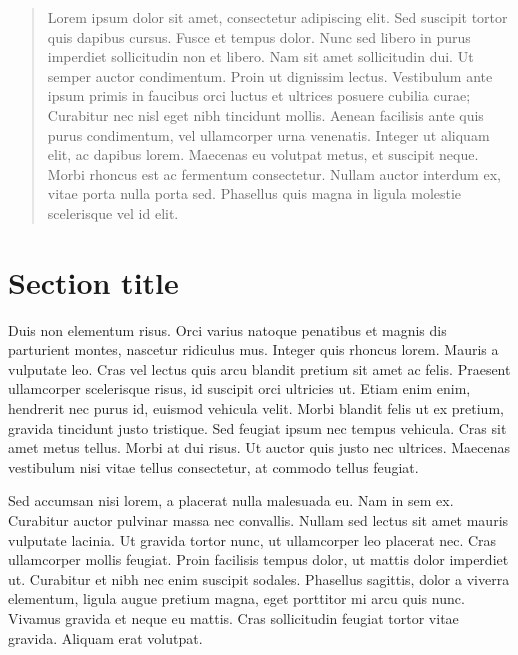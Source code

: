 \documentclass{tufte-handout}
\begin{document}
	\begin{abstract}
		Lorem ipsum dolor sit amet, consectetur adipiscing elit. Sed suscipit tortor quis dapibus cursus. Fusce et tempus dolor. Nunc sed libero in purus imperdiet sollicitudin non et libero. Nam sit amet sollicitudin dui. Ut semper auctor condimentum. Proin ut dignissim lectus. Vestibulum ante ipsum primis in faucibus orci luctus et ultrices posuere cubilia curae; Curabitur nec nisl eget nibh tincidunt mollis. Aenean facilisis ante quis purus condimentum, vel ullamcorper urna venenatis. Integer ut aliquam elit, ac dapibus lorem. Maecenas eu volutpat metus, et suscipit neque. Morbi rhoncus est ac fermentum consectetur. Nullam auctor interdum ex, vitae porta nulla porta sed. Phasellus quis magna in ligula molestie scelerisque vel id elit.
	\end{abstract}
	
	\section{Section title}
		
	Duis non elementum risus. Orci varius natoque penatibus et magnis dis parturient montes, nascetur ridiculus mus. Integer quis rhoncus lorem. Mauris a vulputate leo. Cras vel lectus quis arcu blandit pretium sit amet ac felis. Praesent ullamcorper scelerisque risus, id suscipit orci ultricies ut. Etiam enim enim, hendrerit nec purus id, euismod vehicula velit. Morbi blandit felis ut ex pretium, gravida tincidunt justo tristique. Sed feugiat ipsum nec tempus vehicula. Cras sit amet metus tellus. Morbi at dui risus. Ut auctor quis justo nec ultrices. Maecenas vestibulum nisi vitae tellus consectetur, at commodo tellus feugiat.
	
	Sed accumsan nisi lorem, a placerat nulla malesuada eu. Nam in sem ex. Curabitur auctor pulvinar massa nec convallis. Nullam sed lectus sit amet mauris vulputate lacinia. Ut gravida tortor nunc, ut ullamcorper leo placerat nec. Cras ullamcorper mollis feugiat. Proin facilisis tempus dolor, ut mattis dolor imperdiet ut. Curabitur et nibh nec enim suscipit sodales. Phasellus sagittis, dolor a viverra elementum, ligula augue pretium magna, eget porttitor mi arcu quis nunc. Vivamus gravida et neque eu mattis. Cras sollicitudin feugiat tortor vitae gravida. Aliquam erat volutpat.
		
\end{document}
